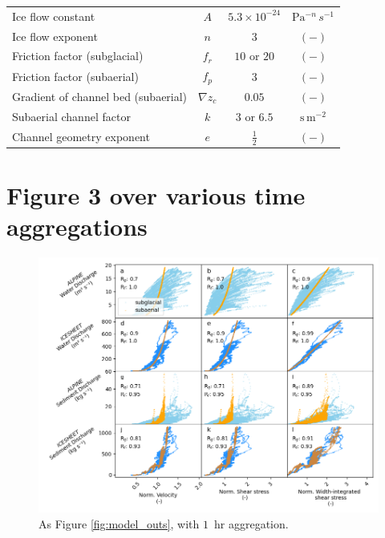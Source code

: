 \documentclass[draft]{agujournal2019}
\newcommand{\unit}[1]{$\mathrm{#1}$}
\begin{document}
\begin{table}[h]
\begin{tabular}{ l  c  c c }
    Ice flow constant &$A$& $5.3\times10^{-24}$ &\unit{Pa}$^{-n}$\,$s^{-1}$\\
    Ice flow exponent &$n$& $3$ &$\mathrm{(-)}$\\
    Friction factor (subglacial) & $f_r$ &$10$ or $20$ & $\mathrm{(-)}$ \\
    Friction factor (subaerial) & $f_p$ & $3$ & $\mathrm{(-)}$\\
    Gradient of channel bed (subaerial) &$\nabla z_c$ &$0.05$& $\mathrm{(-)}$\\
    Subaerial channel factor & $k$ &$3$ or $6.5$ & $\mathrm{s\,m^{-2}}$\\
    Channel geometry exponent &$e$& $\frac{1}{2}$&$\mathrm{(-)}$ \\
    \hline
  \end{tabular}
  \label{table:vpm}


\end{table}

\newpage

\section{Figure 3 over various time aggregations}

\begin{center}
  \begin{figure}[h]
    \includegraphics[width=0.7\linewidth]{Fig3_hr.png}
    \caption{As Figure \ref{fig:model_outs}, with $1$ \,\unit{hr} aggregation.}
    \label{fig:model_outs_1hr}
  \end{figure}
\end{center}
\end{document}

